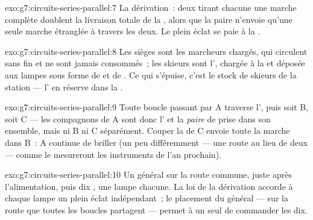 \begin{solution}{exo:g7:circuits-series-parallel:7}
La dérivation~: deux  tirant chacune une marche complète
doublent la livraison totale de la , alors que la paire 
n'envoie qu'une seule marche étranglée à travers les deux. Le plein
éclat se paie à la .
\end{solution}

\begin{solution}{exo:g7:circuits-series-parallel:8}
Les sièges sont les marcheurs chargés, qui circulent sans fin et ne
sont jamais consommés~; les skieurs sont l', chargée à la 
et déposée aux lampes sous forme de  et de . Ce qui
s'épuise, c'est le stock de skieurs de la station --- l' en
réserve dans la .
\end{solution}

\begin{solution}{exo:g7:circuits-series-parallel:9}
Toute boucle passant par A traverse l', puis soit B, soit
C --- les compagnons  de A sont donc l' et la
\emph{paire} de  prise dans son ensemble, mais ni B ni C
séparément. Couper la  de C envoie toute la marche dans B~: A
continue de briller (un peu différemment --- une route au lieu de
deux --- comme le mesureront les instruments de l'an prochain).
\end{solution}

\begin{solution}{exo:g7:circuits-series-parallel:10}
Un  général sur la route commune, juste après
l'alimentation, puis dix  , une lampe chacune.
La loi de la dérivation accorde à chaque lampe un plein éclat
indépendant~; le placement  du général --- sur la route que
toutes les boucles partagent --- permet à un seul  de
commander les dix.
\end{solution}

